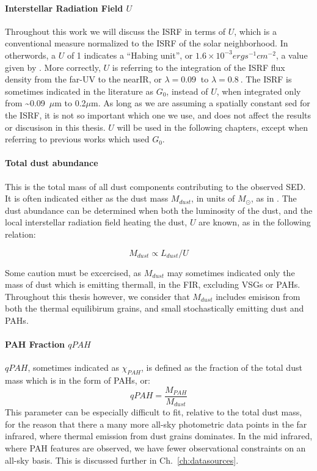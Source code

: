       \paragraph{Interstellar Radiation Field $U$}
        Throughout this work we will discuss the ISRF in terms of $U$, which is a conventional measure normalized to the ISRF of the solar neighborhood. In otherwords, a $U$ of 1 indicates a ``Habing unit'', or $1.6\times{}10^{-3} erg s^{-1} cm^{-2}$, a value given by \cite{habing68}. More correctly, $U$ is referring to the integration of the ISRF flux density from the far-UV to the nearIR, or $\lambda =0.09~$ to $\lambda =0.8~$.  The ISRF is sometimes indicated in the literature as $G_0$, instead of $U$, when integrated only from \textasciitilde{}0.09~$\mu$m to 0.2$\mu$m. As long as we are assuming a spatially constant \acrshort{sed} for the ISRF, it is not so important which one we use, and does not affect the results or discusison in this thesis. $U$ will be used in the following chapters, except when referring to previous works which used $G_0$.

      \paragraph{Total dust abundance}
         This is the total mass of all dust components contributing to the observed SED. It is often indicated either as the dust mass $M_{dust}$, in units of $M_{\odot}$, as in \cite{galliano08a}. The dust abundance can be determined when both the luminosity of the dust, and the local interstellar radiation field heating the dust, $U$ are known, as in the following relation:

           \begin{equation}
            M_{dust} \propto L_{dust}/U
           \end{equation}

          Some caution must be excercised, as $M_{dust}$ may sometimes indicated only the mass of dust which is emitting thermall, in the FIR, excluding VSGs or PAHs. Throughout this thesis however, we consider that $M_{dust}$ includes emisison from both the thermal equilibirum grains, and small stochastically emitting dust and PAHs.

      \paragraph{PAH Fraction $qPAH$}
        $qPAH$, sometimes indicated as $\chi_{PAH}$, is defined as the fraction of the total dust mass which is in the form of PAHs, or:
        \begin{equation}
          qPAH = \frac{M_{PAH}}{M_{dust}}
        \end{equation}
        This parameter can be especially difficult to fit, relative to the total dust mass, for the reason that there a many more all-sky photometric data points in the far infrared, where thermal emission from dust grains dominates. In the mid infrared, where PAH features are observed, we have fewer observational constraints on an all-sky basis. This is discussed further in Ch.~\ref{ch:datasources}.

